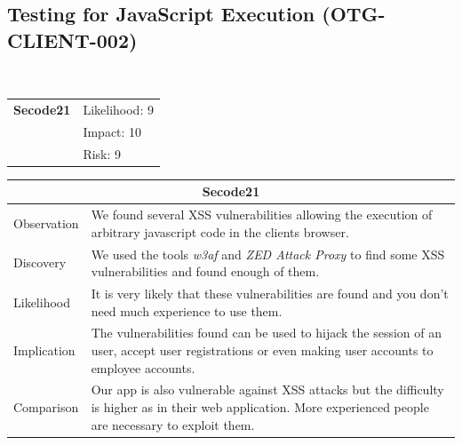\documentclass[headsepline,footsepline,footinclude=false,oneside,fontsize=11pt,paper=a4,listof=totoc,bibliography=totoc]{scrbook} %
\begin{document}
\pagebreak

\subsection{Testing for JavaScript Execution (OTG-CLIENT-002)}\
\begin{tabular}{cR{12cm}}
	\textbf{Secode21} & Likelihood: 9\\& Impact: 10\\& Risk: 9
\end{tabular}

\begin{tabular}{ l|p{11cm}  }
	\hline
	\multicolumn{2}{c}{\textbf{Secode21}} \\
	\hline
	Observation   & We found several XSS vulnerabilities allowing the execution of arbitrary javascript code in the clients browser. \\
	Discovery  & We used the tools \textit{w3af} and \textit{ZED Attack Proxy} to find some XSS vulnerabilities and found enough of them. \\
	Likelihood & It is very likely that these vulnerabilities are found and you don't need much experience to use them. \\
	Implication    & The vulnerabilities found can be used to hijack the session of an user, accept user registrations or even making user accounts to employee accounts. \\
	Comparison & Our app is also vulnerable against XSS attacks but the difficulty is higher as in their web application. More experienced people are necessary to exploit them. \\
	\hline
\end{tabular}
\\
\vspace{0.5cm}
\\
\end{document}
